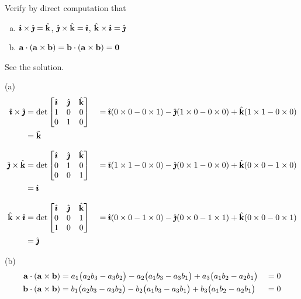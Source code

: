 \begin{question}
Verify by direct computation that
\begin{enumerate}[(a)]
\item
$\hat{\pmb{\imath}}\times\hat{\pmb{\jmath}}=\hat{\mathbf{k}}$, $\hat{\pmb{\jmath}}\times\hat{\mathbf{k}}=\hat{\pmb{\imath}}$, $\hat{\mathbf{k}}\times\hat{\pmb{\imath}}=\hat{\pmb{\jmath}}$
\item
$\mathbf{a}\cdot(\mathbf{a}\times\mathbf{b})=\mathbf{b}\cdot(\mathbf{a}\times\mathbf{b})=\mathbf{0}$
\end{enumerate}
\end{question}

%

\begin{answer}
See the solution.
\end{answer}

\begin{solution}
(a)
\begin{alignat*}{5}
\hat{\pmb{\imath}}\times\hat{\pmb{\jmath}}&=\det\left[\begin{matrix}\hat{\pmb{\imath}}&\hat{\pmb{\jmath}} &\hat{\mathbf{k}}\\
                     1&0&0\\
                     0&1&0\end{matrix}\right]
&&=\hat{\pmb{\imath}}(0\times 0-0\times 1)
-\hat{\pmb{\jmath}}(1\times 0-0\times 0)
+\hat{\mathbf{k}}(1\times 1-0\times 0) \\
&=\hat{\mathbf{k}}\\[0.1in]
\hat{\pmb{\jmath}}\times\hat{\mathbf{k}}&=\det\left[\begin{matrix}\hat{\pmb{\imath}}&\hat{\pmb{\jmath}} &\hat{\mathbf{k}}\\
                     0&1&0\\
                     0&0&1\end{matrix}\right]
&&=\hat{\pmb{\imath}}(1\times 1-0\times 0)
-\hat{\pmb{\jmath}}(0\times 1-0\times 0)
+\hat{\mathbf{k}}(0\times 0-1\times 0)\\
&=\hat{\pmb{\imath}}\\[0.1in]
\hat{\mathbf{k}}\times\hat{\pmb{\imath}}&=\det\left[\begin{matrix}\hat{\pmb{\imath}}&\hat{\pmb{\jmath}} &\hat{\mathbf{k}}\\
                     0&0&1\\
                     1&0&0\end{matrix}\right]
&&=\hat{\pmb{\imath}}(0\times 0-1\times 0)
-\hat{\pmb{\jmath}}(0\times 0-1\times 1)
+\hat{\mathbf{k}}(0\times 0-0\times 1)\\
&=\hat{\pmb{\jmath}}
\end{alignat*}

(b)
\begin{alignat*}{5}
\mathbf{a}\cdot(\mathbf{a}\times\mathbf{b})
&=a_1\big(a_2b_3-a_3b_2\big)
  -a_2\big(a_1b_3-a_3b_1\big)
  +a_3\big(a_1b_2-a_2b_1\big)
&&=0\\
\mathbf{b}\cdot(\mathbf{a}\times\mathbf{b})
&=b_1\big(a_2b_3-a_3b_2\big)
  -b_2\big(a_1b_3-a_3b_1\big)
  +b_3\big(a_1b_2-a_2b_1\big)
&&=0
\end{alignat*}
\end{solution}




